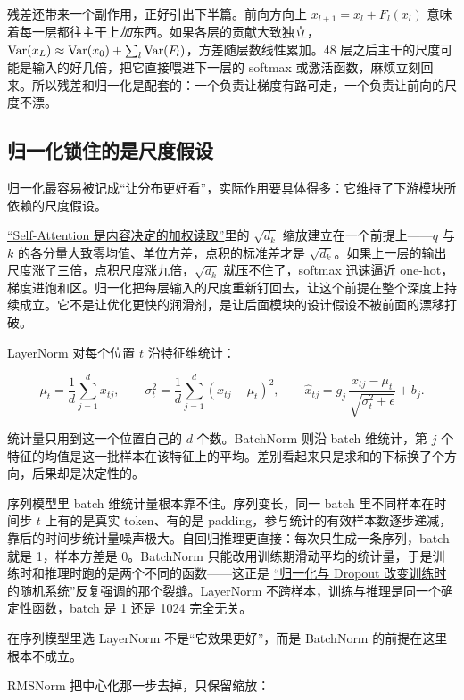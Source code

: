 残差还带来一个副作用，正好引出下半篇。前向方向上 \(x_{l+1}=x_l+F_l(x_l)\) 意味着每一层都往主干上\emph{加}东西。如果各层的贡献大致独立，\(\operatorname{Var}(x_L)\approx\operatorname{Var}(x_0)+\sum_l\operatorname{Var}(F_l)\)，方差随层数线性累加。48 层之后主干的尺度可能是输入的好几倍，把它直接喂进下一层的 softmax 或激活函数，麻烦立刻回来。所以残差和归一化是配套的：一个负责让梯度有路可走，一个负责让前向的尺度不漂。

\subsection{归一化锁住的是尺度假设}

归一化最容易被记成``让分布更好看''，实际作用要具体得多：它维持了下游模块所依赖的尺度假设。

\hyperref[sec:14-Deep-Learning/05-Attention-and-Sequence-Models/01]{``Self-Attention 是内容决定的加权读取''}里的 \(\sqrt{d_k}\) 缩放建立在一个前提上——\(q\) 与 \(k\) 的各分量大致零均值、单位方差，点积的标准差才是 \(\sqrt{d_k}\)。如果上一层的输出尺度涨了三倍，点积尺度涨九倍，\(\sqrt{d_k}\) 就压不住了，softmax 迅速逼近 one-hot，梯度进饱和区。归一化把每层输入的尺度重新钉回去，让这个前提在整个深度上持续成立。它不是让优化更快的润滑剂，是让后面模块的设计假设不被前面的漂移打破。

LayerNorm 对每个位置 \(t\) 沿特征维统计：

\[
\mu_t = \frac1d\sum_{j=1}^{d} x_{tj},\qquad
\sigma_t^2 = \frac1d\sum_{j=1}^{d}(x_{tj}-\mu_t)^2,\qquad
\hat x_{tj} = g_j\,\frac{x_{tj}-\mu_t}{\sqrt{\sigma_t^2+\epsilon}}+b_j .
\]

统计量只用到这一个位置自己的 \(d\) 个数。BatchNorm 则沿 batch 维统计，第 \(j\) 个特征的均值是这一批样本在该特征上的平均。差别看起来只是求和的下标换了个方向，后果却是决定性的。

序列模型里 batch 维统计量根本靠不住。序列变长，同一 batch 里不同样本在时间步 \(t\) 上有的是真实 token、有的是 padding，参与统计的有效样本数逐步递减，靠后的时间步统计量噪声极大。自回归推理更直接：每次只生成一条序列，batch 就是 1，样本方差是 0。BatchNorm 只能改用训练期滑动平均的统计量，于是训练时和推理时跑的是两个不同的函数——这正是 \hyperref[sec:14-Deep-Learning/03-Optimization-and-Training/03]{``归一化与 Dropout 改变训练时的随机系统''}反复强调的那个裂缝。LayerNorm 不跨样本，训练与推理是同一个确定性函数，batch 是 1 还是 1024 完全无关。

在序列模型里选 LayerNorm 不是``它效果更好''，而是 BatchNorm 的前提在这里根本不成立。

RMSNorm 把中心化那一步去掉，只保留缩放：


